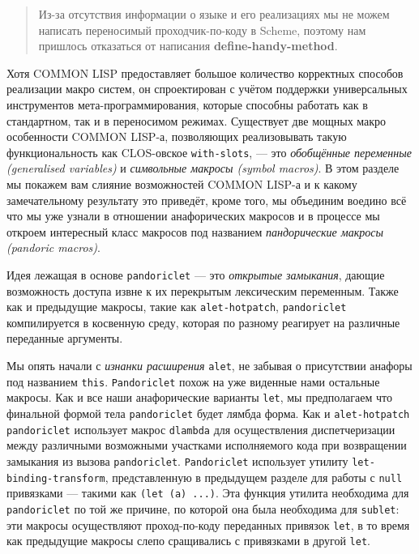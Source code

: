 \begin{quote}Из-за отсутствия информации о языке и его реализациях мы не можем написать переносимый проходчик-по-коду в Scheme, поэтому нам пришлось отказаться от написания \textbf{de\-fine\--\-han\-dy\--\-me\-thod}.\end{quote}

Хотя COMMON LISP предоставляет большое количество корректных способов реализации макро систем, он спроектирован с учётом поддержки универсальных инструментов мета-программирования, которые способны работать как в стандартном, так и в переносимом режимах. Существует две мощных макро особенности COMMON LISP-а, позволяющих реализовывать такую функциональность как CLOS-овское \verb"with-slots", --- это \emph{обобщённые переменные (generalised variables)} и \emph{символьные макросы (symbol macros)}. В этом разделе мы покажем вам слияние возможностей COMMON LISP-а и к какому замечательному результату это приведёт, кроме того, мы объединим воедино всё что мы уже узнали в отношении анафорических макросов и в процессе мы откроем интересный класс макросов под названием \emph{пандорические макросы (pandoric macros)}.

Идея лежащая в основе \verb"pandoriclet" --- это \emph{открытые замыкания}, дающие возможность доступа извне к их перекрытым лексическим переменным. Также как и предыдущие макросы, такие как \verb"alet-hotpatch", \verb"pandoriclet" компилируется в косвенную среду, которая по разному реагирует на различные переданные аргументы.

Мы опять начали с \emph{изнанки расширения} \verb"alet", не забывая о присутствии анафоры под названием \verb"this". \verb"Pandoriclet" похож на уже виденные нами остальные макросы. Как и все наши анафорические варианты \verb"let", мы предполагаем что финальной формой тела \verb"pandoriclet" будет лямбда форма. Как и \verb"alet-hotpatch" \verb"pandoriclet" использует макрос \verb"dlambda" для осуществления диспетчеризации между различными возможными участками исполняемого кода при возвращении замыкания из вызова \verb"pandoriclet". \verb"Pandoriclet" использует утилиту \verb"let-binding-transform", представленную в предыдущем разделе для работы с \verb"null" привязками --- такими как \verb"(let (a) ...)". Эта функция утилита необходима для \verb"pandoriclet" по той же причине, по которой она была необходима для \verb"sublet": эти макросы осуществляют проход-по-коду переданных привязок \verb"let", в то время как предыдущие макросы слепо сращивались с привязками в другой \verb"let".

